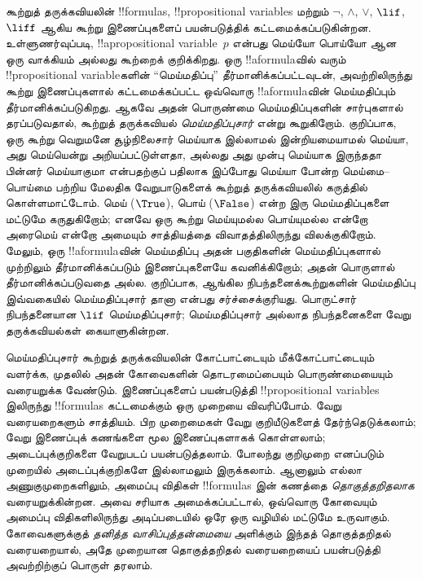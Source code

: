 \documentclass[../../../include/open-logic-section]{subfiles}
\begin{document}


கூற்றுத் தருக்கவியலின் !!{formula}s, !!{propositional variable}s
மற்றும் $\lnot$, $\land$, $\lor$, $\lif$, $\liff$ ஆகிய கூற்று
இணைப்புகளைப் பயன்படுத்திக் கட்டமைக்கப்படுகின்றன. உள்ளுணர்வுப்படி,
!!a{propositional variable}~$p$ என்பது மெய்யோ பொய்யோ ஆன ஒரு
வாக்கியம் அல்லது கூற்றைக் குறிக்கிறது. ஒரு !!a{formula}வில் வரும்
!!{propositional variable}களின் ``மெய்மதிப்பு'' தீர்மானிக்கப்பட்டவுடன்,
அவற்றிலிருந்து கூற்று இணைப்புகளால் கட்டமைக்கப்பட்ட ஒவ்வொரு
!!a{formula}வின் மெய்மதிப்பும் தீர்மானிக்கப்படுகிறது. ஆகவே அதன்
பொருண்மை மெய்மதிப்புகளின் சார்புகளால் தரப்படுவதால், கூற்றுத் தருக்கவியல்
\emph{மெய்மதிப்புசார்} என்று கூறுகிறோம். குறிப்பாக, ஒரு கூற்று வெறுமனே
சூழ்நிலைசார் மெய்யாக இல்லாமல் இன்றியமையாமல் மெய்யா, அது மெய்யென்று
அறியப்பட்டுள்ளதா, அல்லது அது முன்பு மெய்யாக இருந்ததா பின்னர் மெய்யாகுமா
என்பதற்குப் பதிலாக இப்போது மெய்யா போன்ற மெய்மை--பொய்மை பற்றிய மேலதிக
வேறுபாடுகளைக் கூற்றுத் தருக்கவியலில் கருத்தில் கொள்ளமாட்டோம். மெய்
($\True$), பொய் ($\False$) என்ற இரு மெய்மதிப்புகளை மட்டுமே கருதுகிறோம்;
எனவே ஒரு கூற்று மெய்யுமல்ல பொய்யுமல்ல என்றோ அரைமெய் என்றோ அமையும்
சாத்தியத்தை விவாதத்திலிருந்து விலக்குகிறோம். மேலும், ஒரு !!a{formula}வின்
மெய்மதிப்பு அதன் பகுதிகளின் மெய்மதிப்புகளால் முற்றிலும் தீர்மானிக்கப்படும்
இணைப்புகளையே கவனிக்கிறோம்; அதன் பொருளால் தீர்மானிக்கப்படுவதை அல்ல.
குறிப்பாக, ஆங்கில நிபந்தனைக்கூற்றுகளின் மெய்மதிப்பு இவ்வகையில்
மெய்மதிப்புசார் தானா என்பது சர்ச்சைக்குரியது. பொருட்சார் நிபந்தனையான
$\lif$ மெய்மதிப்புசார்; மெய்மதிப்புசார் அல்லாத நிபந்தனைகளை வேறு
தருக்கவியல்கள் கையாளுகின்றன.

மெய்மதிப்புசார் கூற்றுத் தருக்கவியலின் கோட்பாட்டையும் மீக்கோட்பாட்டையும்
வளர்க்க, முதலில் அதன் கோவைகளின் தொடரமைப்பையும் பொருண்மையையும் வரையறுக்க
வேண்டும். இணைப்புகளைப் பயன்படுத்தி !!{propositional variable}s இலிருந்து
!!{formula}s கட்டமைக்கும் ஒரு முறையை விவரிப்போம். வேறு வரையறைகளும்
சாத்தியம். பிற முறைமைகள் வேறு குறியீடுகளைத் தேர்ந்தெடுக்கலாம்; வேறு
இணைப்புக் கணங்களை மூல இணைப்புகளாகக் கொள்ளலாம்; அடைப்புக்குறிகளை வேறுபடப்
பயன்படுத்தலாம். போலந்து குறிமுறை எனப்படும் முறையில் அடைப்புக்குறிகளே
இல்லாமலும் இருக்கலாம். ஆனாலும் எல்லா அணுகுமுறைகளிலும், அமைப்பு விதிகள்
!!{formula}s இன் கணத்தை \emph{தொகுத்தறிதலாக} வரையறுக்கின்றன. அவை சரியாக
அமைக்கப்பட்டால், ஒவ்வொரு கோவையும் அமைப்பு விதிகளிலிருந்து அடிப்படையில்
ஒரே ஒரு வழியில் மட்டுமே உருவாகும். கோவைகளுக்குத் \emph{தனித்த
வாசிப்புத்தன்மையை} அளிக்கும் இந்தத் தொகுத்தறிதல் வரையறையால், அதே
முறையான தொகுத்தறிதல் வரையறையைப் பயன்படுத்தி அவற்றிற்குப் பொருள் தரலாம்.
\end{document}
